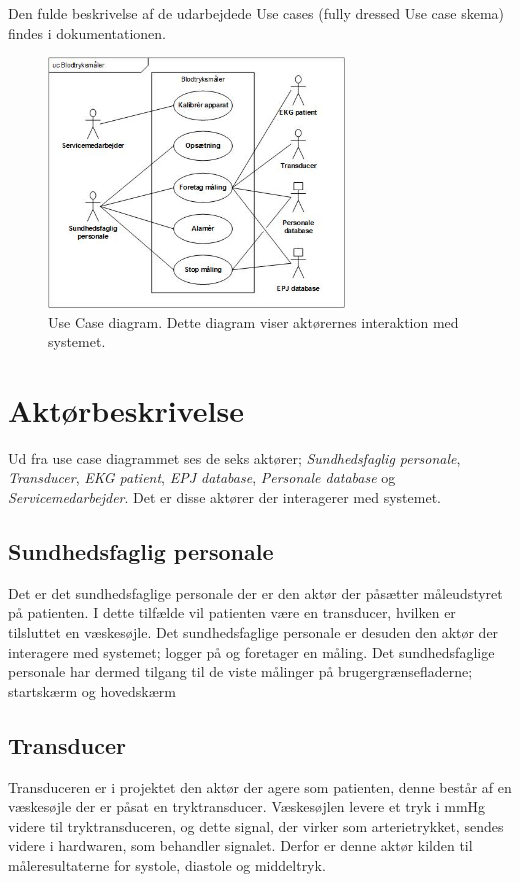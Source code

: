 Den fulde beskrivelse af de udarbejdede Use cases (fully dressed Use case skema) findes i dokumentationen.
\begin{figure}[H]
\includegraphics[width =0.7\textwidth , center]{billeder/UseCaseDiagram}
\caption{Use Case diagram. Dette diagram viser aktørernes interaktion med systemet.}
\end{figure}
\section{Aktørbeskrivelse}
Ud fra use case diagrammet ses de seks aktører; \textit{Sundhedsfaglig personale}, \textit{Transducer}, \textit{EKG patient}, \textit{EPJ database}, \textit{Personale database} og \textit{Servicemedarbejder}. Det er disse aktører der interagerer med systemet.
\subsection{Sundhedsfaglig personale}
Det er det sundhedsfaglige personale der er den aktør der påsætter måleudstyret på patienten. I dette tilfælde vil patienten være en transducer, hvilken er tilsluttet en væskesøjle. Det sundhedsfaglige personale er desuden den aktør der interagere med systemet; logger på og foretager en måling. Det sundhedsfaglige personale har dermed tilgang til de viste målinger på brugergrænsefladerne; startskærm og hovedskærm
\subsection{Transducer}
Transduceren er i projektet den aktør der agere som patienten, denne består af en væskesøjle der er påsat en tryktransducer. Væskesøjlen levere et tryk i mmHg videre til tryktransduceren, og dette signal, der virker som arterietrykket, sendes videre i hardwaren, som behandler signalet. Derfor er denne aktør kilden til måleresultaterne for systole, diastole og middeltryk. 
